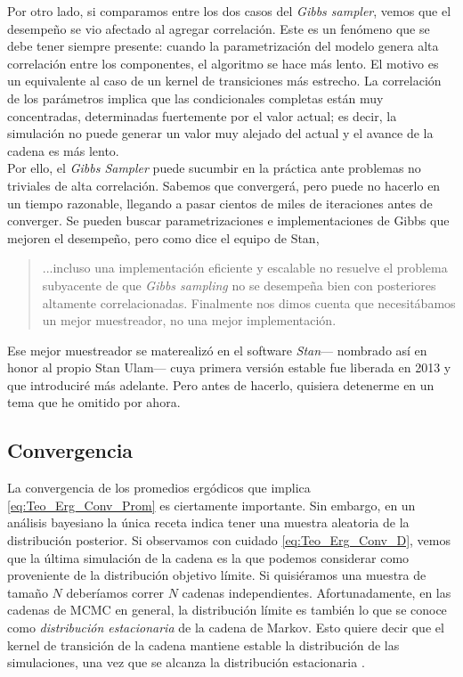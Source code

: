 Por otro lado, si comparamos entre los dos casos del \textit{Gibbs sampler}, vemos que el desempeño se vio afectado al agregar correlación. Este es un fenómeno que se debe tener siempre presente: cuando la parametrización del modelo genera alta correlación entre los componentes, el algoritmo se hace más lento. El motivo es un equivalente al caso de un kernel de transiciones más estrecho. La correlación de los parámetros implica que las condicionales completas están muy concentradas, determinadas fuertemente por el valor actual; es decir, la simulación no puede generar un valor muy alejado del actual y el avance de la cadena es más lento.\\ 

Por ello, el \textit{Gibbs Sampler} puede sucumbir en la práctica ante problemas no triviales de alta correlación. Sabemos que convergerá, pero puede no hacerlo en un tiempo razonable, llegando a pasar cientos de miles de iteraciones antes de converger. Se pueden buscar parametrizaciones e implementaciones de Gibbs que mejoren el desempeño, pero como dice el equipo de {\color{red} Stan}, 
\begin{quote}
...incluso una implementación eficiente y escalable no resuelve el problema subyacente de que \textit{Gibbs sampling} no se desempeña bien con posteriores altamente correlacionadas. Finalmente nos dimos cuenta que necesitábamos un mejor muestreador, no una mejor implementación.
\end{quote}

Ese mejor muestreador se materealizó en el software \textit{Stan}--- nombrado así en honor al propio Stan Ulam--- cuya primera versión estable fue liberada en 2013 y que introduciré más adelante. Pero antes de hacerlo, quisiera detenerme en un tema que he omitido por ahora.\\

\subsection{Convergencia}

La convergencia de los promedios ergódicos que implica \eqref{eq:Teo_Erg_Conv_Prom} es ciertamente importante. Sin embargo, en un análisis bayesiano la única receta indica tener una muestra aleatoria de la distribución posterior. Si observamos con cuidado \eqref{eq:Teo_Erg_Conv_D}, vemos que la última simulación de la cadena es la que podemos considerar como proveniente de la distribución objetivo límite. Si quisiéramos una muestra de tamaño $N$ deberíamos correr $N$ cadenas independientes. Afortunadamente, en las cadenas de MCMC en general, la distribución límite es también lo que se conoce como \textit{distribución estacionaria} de la cadena de Markov. Esto quiere decir que el kernel de transición de la cadena mantiene estable la distribución de las simulaciones, una vez que se alcanza la distribución estacionaria \parencite{Neal93}.\\

